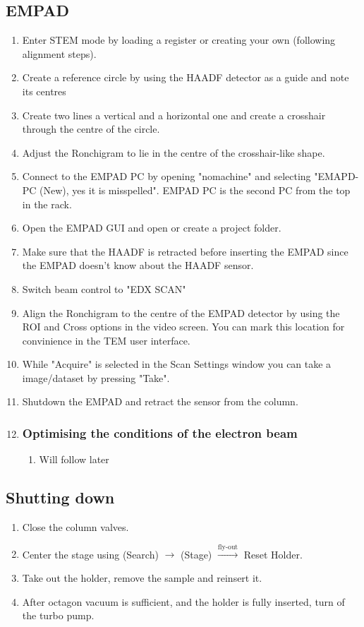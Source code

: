 \documentclass[a4paper]{scrartcl}
\begin{document}
\subsection*{EMPAD}
\begin{enumerate}
	\item Enter STEM mode by loading a register or creating your own (following alignment steps).
	\item Create a reference circle by using the HAADF detector as a guide and note its centres
	\item Create two lines a vertical and a horizontal one and create a crosshair through the centre of the circle.
	\item Adjust the Ronchigram to lie in the centre of the crosshair-like shape.
	\item Connect to the EMPAD PC by opening "nomachine" and selecting "EMAPD-PC (New), yes it is misspelled". EMPAD PC is the second PC from the top in the rack.
	\item Open the EMPAD GUI and open or create a project folder.
	\item Make sure that the HAADF is retracted before inserting the EMPAD since the EMPAD doesn't know about the HAADF sensor.
	\item Switch beam control to "EDX SCAN"
	\item Align the Ronchigram to the centre of the EMPAD detector by using the ROI and Cross options in the video screen. You can mark this location for convinience in the TEM user interface.
	\item While "Acquire" is selected in the Scan Settings window you can take a image/dataset by pressing "Take".
	\item Shutdown the EMPAD and retract the sensor from the column.
	\item {\subsubsection*{Optimising the conditions of the electron beam}
	      \begin{enumerate}
		      \item Will follow later
	      \end{enumerate}}
\end{enumerate}

\subsection*{Shutting down}
\begin{enumerate}
	\item Close the column valves.
	\item Center the stage using (Search) $\rightarrow$ (Stage) $\xrightarrow{\text{fly-out}}$ Reset Holder.
	\item Take out the holder, remove the sample and reinsert it.
	\item After octagon vacuum is sufficient, and the holder is fully inserted, turn of the turbo pump.
\end{enumerate}
\end{document}
